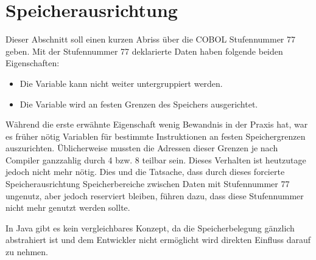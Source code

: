 \section{Speicherausrichtung}
Dieser Abschnitt soll einen kurzen Abriss über die COBOL Stufennummer 77 geben. Mit der Stufennummer 77 deklarierte Daten haben folgende beiden Eigenschaften:

\begin{itemize}
    \item Die Variable kann nicht weiter untergruppiert werden.
    \item Die Variable wird an festen Grenzen des Speichers ausgerichtet.
\end{itemize}

Während die erste erwähnte Eigenschaft wenig Bewandnis in der Praxis hat, war es früher nötig Variablen für bestimmte Instruktionen an festen Speichergrenzen auszurichten. Üblicherweise mussten die Adressen dieser Grenzen je nach Compiler ganzzahlig durch 4 bzw. 8 teilbar sein. Dieses Verhalten ist heutzutage jedoch nicht mehr nötig. Dies und die Tatsache, dass durch dieses forcierte Speicherausrichtung Speicherbereiche zwischen Daten mit Stufennummer 77 ungenutz, aber jedoch reserviert bleiben, führen dazu, dass diese Stufennummer nicht mehr genutzt werden sollte.

In Java gibt es kein vergleichbares Konzept, da die Speicherbelegung gänzlich abstrahiert ist und dem Entwickler nicht ermöglicht wird direkten Einfluss darauf zu nehmen.